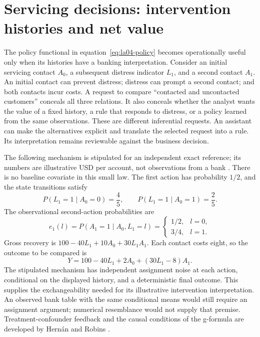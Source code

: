 \section{Servicing decisions: intervention histories and net value}
\label{exec14:l5-servicing}

The policy functional in equation~\eqref{eq:la04-policy} becomes operationally
useful only when its histories have a banking interpretation. Consider an
initial servicing contact $A_0$, a subsequent distress indicator $L_1$, and a
second contact $A_1$. An initial contact can prevent distress; distress can
prompt a second contact; and both contacts incur costs. A request to compare
``contacted and uncontacted customers'' conceals all three relations. It also
conceals whether the analyst wants the value of a fixed history, a rule that
responds to distress, or a policy learned from the same observations. These are
different inferential requests. An assistant can make the alternatives explicit
and translate the selected request into a rule. Its interpretation remains
reviewable against the business decision.

The following mechanism is stipulated for an independent exact reference; its
numbers are illustrative USD per account, not observations from a bank
\cite{exec14_workflow_oracle}. There is no baseline covariate in this small law.
The first action has probability $1/2$, and the state transitions satisfy
\[
 P(L_1=1\mid A_0=0)=\frac45,\qquad
 P(L_1=1\mid A_0=1)=\frac25.
\]
The observational second-action probabilities are
\[
 e_1(l)=P(A_1=1\mid A_0,L_1=l)
 =\begin{cases}1/2,&l=0,\\3/4,&l=1.\end{cases}
\]
Gross recovery is $100-40L_1+10A_0+30L_1A_1$. Each contact costs eight, so the
outcome to be compared is
\[
 Y=100-40L_1+2A_0+(30L_1-8)A_1.
 \label{eq:exec14-l5-net}
\]
The stipulated mechanism has independent assignment noise at each action,
conditional on the displayed history, and a deterministic final outcome.
This supplies the exchangeability needed for its illustrative intervention
interpretation. An observed bank table with the same conditional means would
still require an assignment argument; numerical resemblance would not supply
that premise. Treatment-confounder feedback and the causal conditions of the
g-formula are developed by Hern\'an and Robins \cite{hernan2020}.

